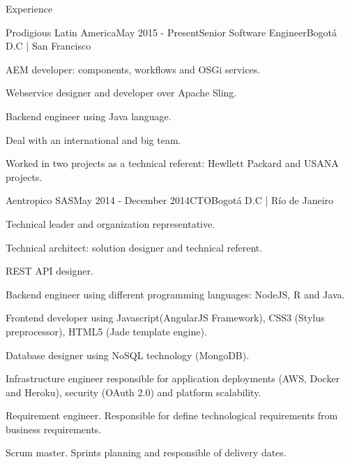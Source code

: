\documentclass[spanish]{resume}
\begin{document}
\begin{rSection}{Experience}

\begin{rSubsection}{Prodigious Latin America}{May 2015 - Present}{Senior Software Engineer}{Bogot\'a D.C | San Francisco}
\item AEM developer: components, workflows and OSGi services.
\item Webservice designer and developer over Apache Sling.  
\item Backend engineer using Java language.
\item Deal with an international and big team.
\item Worked in two projects as a technical referent: Hewllett Packard and USANA projects.
\end{rSubsection}


\begin{rSubsection}{Aentropico SAS}{May 2014 - December 2014}{CTO}{Bogot\'a D.C | R\'io de Janeiro}
\item Technical leader and organization representative.
\item Technical architect: solution designer and technical referent.
\item REST API designer.
\item Backend engineer using different programming languages: NodeJS, R and Java.
\item Frontend developer using Javascript(AngularJS Framework), CSS3 (Stylus preprocessor), HTML5 (Jade template engine).
\item Database designer using NoSQL technology (MongoDB).
\item Infrastructure engineer responsible for application deployments (AWS, Docker and Heroku), security (OAuth 2.0) and platform scalability.
\item Requirement engineer. Responsible for define technological requirements from business requirements.
\item Scrum master. Sprints planning and responsible of delivery dates.
\end{rSubsection}



\end{rSection}
\end{document}
